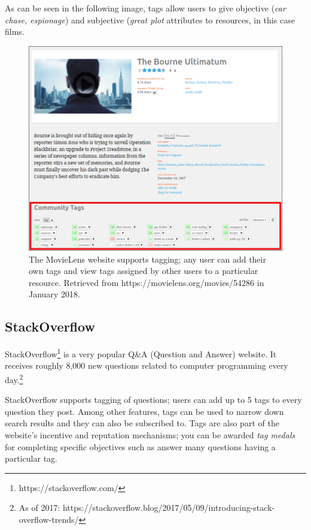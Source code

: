 As can be seen in the following image, tags allow users to give objective (\textit{car chase, espionage}) and subjective (\textit{great plot} attributes to resources, in this case films.

\begin{figure}[H]
    \centering
    \includegraphics[width=\textwidth]{chapters/02_social_tagging/images/movielens.png}
    \caption{The MovieLens website supports tagging; any user can add their own tags and view tags assigned by other users to a particular resource. Retrieved from https://movielens.org/movies/54286 in January 2018.}
    \label{fig:movielens}
\end{figure}

\subsection{StackOverflow}

StackOverflow\footnote{https://stackoverflow.com/} is a very popular Q\&A (Question and Answer) website. It receives roughly 8,000 new questions related to computer programming every day.\footnote{As of 2017: https://stackoverflow.blog/2017/05/09/introducing-stack-overflow-trends/}

StackOverflow supports tagging of questions; users can add up to 5 tags to every question they post. Among other features, tags can be used to narrow down search results and they can also be subscribed to. Tags are also part of the website's incentive and reputation mechanisms; you can be awarded \textit{tag medals} for completing specific objectives such as answer many questions having a particular tag.

